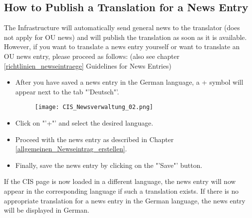 \subsection{How to Publish a Translation for a News Entry}
\label{uebersetzung_eines_neweintrags}
The Infrastructure will automatically send general news to the translator (does not apply for OU news) and will publish the translation as soon as it is available.
However, if you want to translate a news entry yourself or want to translate an OU news entry, please proceed as follows:
(also see chapter \ref{richtlinien_newseintraege} Guidelines for News Entries)
		\begin{itemize}
			\item After you have saved a news entry in the German language, a + symbol will appear next to the tab "'Deutsch"'.
				\begin{figure}
				\centering
				\texttt{[image: CIS\_Newsverwaltung\_02.png]}
				\end{figure}
			\item Click on "'+"' and select the desired language.
			\item Proceed with the news entry as described in Chapter \ref{allgemeinen_Newseintrag_erstellen}.
			\item Finally, save the news entry by clicking on the "'Save"' button.
		\end{itemize}
If the CIS page is now loaded in a different language, the news entry will now appear in the corresponding language if such a translation exists.
If there is no appropriate translation for a news entry in the German language, the news entry will be displayed in German.